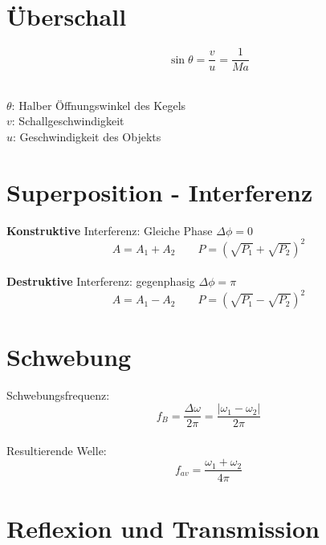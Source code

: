\section{Überschall}

\[\boxed{
	\sin \theta = \frac{v}{u} = \frac{1}{Ma}
}\]
\\
\begin{footnotesize}
	$\theta$: Halber Öffnungswinkel des Kegels\\
	$v$: Schallgeschwindigkeit\\
	$u$: Geschwindigkeit des Objekts\\
\end{footnotesize}


\section{Superposition - Interferenz}
\textbf{Konstruktive} Interferenz: Gleiche Phase $\Delta \phi = 0$
\[
	A = A_1 + A_2 \qquad P = \left( \sqrt{P_1} + \sqrt{P_2} \right)^2
\]
\\
\textbf{Destruktive} Interferenz: gegenphasig $\Delta \phi = \pi$
\[
	A = A_1 - A_2 \qquad P = \left( \sqrt{P_1} - \sqrt{P_2} \right)^2
\]


\section{Schwebung}
Schwebungsfrequenz:
\[\boxed{
	f_B = \frac{\Delta \omega}{2\pi} = \frac{\left| \omega_1 - \omega_2 \right|}{2\pi}
}\]
\\
Resultierende Welle:
\[
	f_{av} = \frac{\omega_1 + \omega_2}{4\pi}
\]



\section{Reflexion und Transmission}


